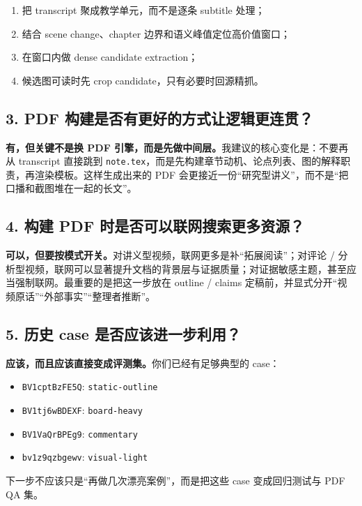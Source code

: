 \documentclass[a4paper]{article}
\begin{document}
\begin{enumerate}
\item 把 transcript 聚成教学单元，而不是逐条 subtitle 处理；
\item 结合 scene change、chapter 边界和语义峰值定位高价值窗口；
\item 在窗口内做 dense candidate extraction；
\item 候选图可读时先 crop candidate，只有必要时回源精抓。
\end{enumerate}

\subsection{3. PDF 构建是否有更好的方式让逻辑更连贯？}

\textbf{有，但关键不是换 PDF 引擎，而是先做中间层。}我建议的核心变化是：不要再从 transcript 直接跳到 \texttt{note.tex}，而是先构建章节动机、论点列表、图的解释职责，再渲染模板。这样生成出来的 PDF 会更接近一份“研究型讲义”，而不是“把口播和截图堆在一起的长文”。

\subsection{4. 构建 PDF 时是否可以联网搜索更多资源？}

\textbf{可以，但要按模式开关。}对讲义型视频，联网更多是补“拓展阅读”；对评论 / 分析型视频，联网可以显著提升文档的背景层与证据质量；对证据敏感主题，甚至应当强制联网。最重要的是把这一步放在 outline / claims 定稿前，并显式分开“视频原话”“外部事实”“整理者推断”。

\subsection{5. 历史 case 是否应该进一步利用？}

\textbf{应该，而且应该直接变成评测集。}你们已经有足够典型的 case：

\begin{itemize}
\item \texttt{BV1cptBzFE5Q}: \texttt{static-outline}
\item \texttt{BV1tj6wBDEXF}: \texttt{board-heavy}
\item \texttt{BV1VaQrBPEg9}: \texttt{commentary}
\item \texttt{bv1z9qzbgewv}: \texttt{visual-light}
\end{itemize}

下一步不应该只是“再做几次漂亮案例”，而是把这些 case 变成回归测试与 PDF QA 集。
\end{document}
